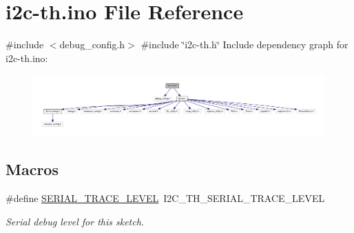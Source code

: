 \hypertarget{i2c-th_8ino}{}\section{i2c-\/th.ino File Reference}
\label{i2c-th_8ino}
{\ttfamily \#include $<$debug\+\_\+config.\+h$>$}\newline
{\ttfamily \#include \char`\"{}i2c-\/th.\+h\char`\"{}}\newline
Include dependency graph for i2c-\/th.ino\+:
\nopagebreak
\begin{figure}[H]
\begin{center}
\leavevmode
\includegraphics[width=350pt]{i2c-th_8ino__incl}
\end{center}
\end{figure}
\subsection*{Macros}
\begin{DoxyCompactItemize}
\item 
\mbox{\label{i2c-th_8ino_a31fa5c36fa17c66feec7a67b76c3e786}} 
\#define \hyperlink{i2c-th_8ino_a31fa5c36fa17c66feec7a67b76c3e786}{S\+E\+R\+I\+A\+L\+\_\+\+T\+R\+A\+C\+E\+\_\+\+L\+E\+V\+EL}~I2\+C\+\_\+\+T\+H\+\_\+\+S\+E\+R\+I\+A\+L\+\_\+\+T\+R\+A\+C\+E\+\_\+\+L\+E\+V\+EL
\begin{DoxyCompactList}\small\item\em Serial debug level for this sketch. \end{DoxyCompactList}\end{DoxyCompactItemize}
